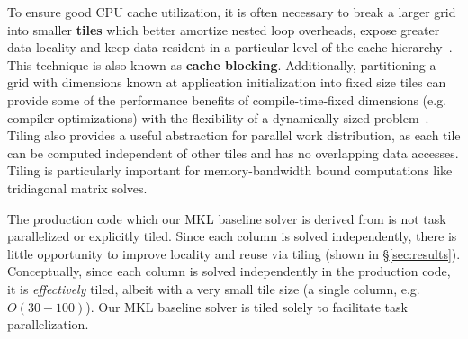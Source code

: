 \documentclass{sig-alternate-05-2015}
\begin{document}
\begin{figure}[!bth]
\begin{minipage}{0.49\textwidth}
{    }
  \end{minipage}
  \begin{minipage}{0.49\textwidth}
    \centering
  \end{minipage}
\end{figure}

To ensure good CPU cache utilization, it is often necessary to break a larger
  grid into smaller \textbf{tiles} which better amortize nested loop overheads, expose
  greater data locality and keep data resident in a particular level of the
  cache hierarchy~\cite{blocked_algorithms}.
This technique is also known as \textbf{cache blocking}.
Additionally, partitioning a grid with dimensions known at application
  initialization into fixed size tiles can provide some of the performance
  benefits of compile-time-fixed dimensions (e.g. compiler optimizations) with
  the flexibility of a dynamically sized problem~\cite{kokkos}.
Tiling also provides a useful abstraction for parallel work distribution, as
  each tile can be computed independent of other tiles and has no overlapping
  data accesses.
Tiling is particularly important for memory-bandwidth bound computations like
  tridiagonal matrix solves.

The production code which our MKL baseline solver is derived from is not task
  parallelized or explicitly tiled.
Since each column is solved independently, there is little opportunity to improve
  locality and reuse via tiling (shown in \S\ref{sec:results}).
Conceptually, since each column is solved independently in the production code,
  it is \emph{effectively} tiled, albeit with a very small tile size (a single
  column, e.g. \(O(30-100)\)).
Our MKL baseline solver is tiled solely to facilitate task parallelization.
\end{document}

